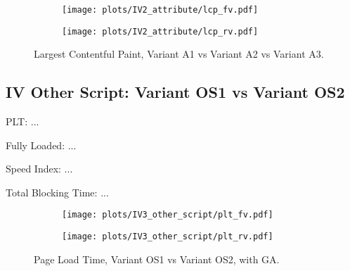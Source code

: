 \begin{figure}
	\centering
	\begin{subfigure}{.5\textwidth}
		\centering
		\texttt{[image: plots/IV2\_attribute/lcp\_fv.pdf]}
		\label{fig:sub1}
	\end{subfigure}%
	\begin{subfigure}{.5\textwidth}
		\centering
		\texttt{[image: plots/IV2\_attribute/lcp\_rv.pdf]}
		\label{fig:sub2}
	\end{subfigure}
	\caption{Largest Contentful Paint, Variant A1 vs Variant A2 vs Variant A3.}
	\label{figure:plt_original_test}
\end{figure}



\clearpage




\subsection{IV Other Script: Variant OS1 vs Variant OS2}




PLT: ...

Fully Loaded: ...

Speed Index: ...

Total Blocking Time: ...


\begin{figure}
	\centering
	\begin{subfigure}{.5\textwidth}
		\centering
		\texttt{[image: plots/IV3\_other\_script/plt\_fv.pdf]}
		\label{fig:sub1}
	\end{subfigure}%
	\begin{subfigure}{.5\textwidth}
		\centering
		\texttt{[image: plots/IV3\_other\_script/plt\_rv.pdf]}
		\label{fig:sub2}
	\end{subfigure}
	\caption{Page Load Time, Variant OS1 vs Variant OS2, with GA.}
	\label{figure:plt_original_test}
\end{figure}


